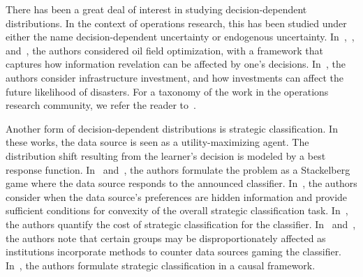 
There has been a great deal of interest in studying decision-dependent distributions. In the context of operations research, this has been studied under either the name decision-dependent uncertainty or endogenous uncertainty. In~\citet{Jonsbraten:1998wc},~\citet{Jonsbraten:1998wk}, and~\citet{Goel:2004wb}, the authors considered oil field optimization, with a framework that captures how information revelation can be affected by one's decisions. In~\citet{Peeta:2010tb}, the authors consider infrastructure investment, and how investments can affect the future likelihood of disasters. For a taxonomy of the work in the operations research community, we refer the reader to~\citet{Hellemo:2018tf}.

Another form of decision-dependent distributions is strategic classification. In these works, the data source is seen as a utility-maximizing agent. The distribution shift resulting from the learner's decision is modeled by a best response function. In~\citet{Hardt:2016we} and~\citet{Bruckner:2011wy}, the authors formulate the problem as a Stackelberg game where the data source responds to the announced classifier. In~\citet{Dong:2018td}, the authors consider when the data source's preferences are hidden information and provide sufficient conditions for convexity of the overall strategic classification task. In~\citet{Akyol:2016wu}, the authors quantify the cost of strategic classification for the classifier. In~\citet{Milli:2019tf} and~\citet{Hu:2019wu}, the authors note that certain groups may be disproportionately affected as institutions incorporate methods to counter data sources gaming the classifier. In~\citet{Miller:2020vy}, the authors formulate strategic classification in a causal framework.

